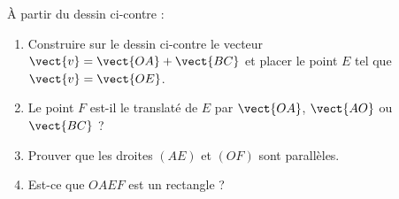 
\begin{exercice}\label{exosmath-0676}

\begin{wrapfigure}{r}{8.0cm}
   \vspace{-0.5cm}        %
   \centering                                                                                                                               
                                                                                                                
\end{wrapfigure}

À partir du dessin ci-contre :
    \begin{enumerate}
        \item
            Construire sur le dessin ci-contre le vecteur \( \vect{ v }=\vect{ OA }+\vect{ BC }\) et placer le point \( E\) tel que \( \vect{ v }=\vect{ OE }\).
        \item
            Le point \( F\) est-il le translaté de \( E\) par \( \vect{ OA }\), \( \vect{ AO }\) ou \( \vect{ BC }\) ?
        \item
            Prouver que les droites \( (AE)\) et \( (OF)\) sont parallèles.
        \item
            Est-ce que \( OAEF\) est un rectangle ?
    \end{enumerate}

\end{exercice}
